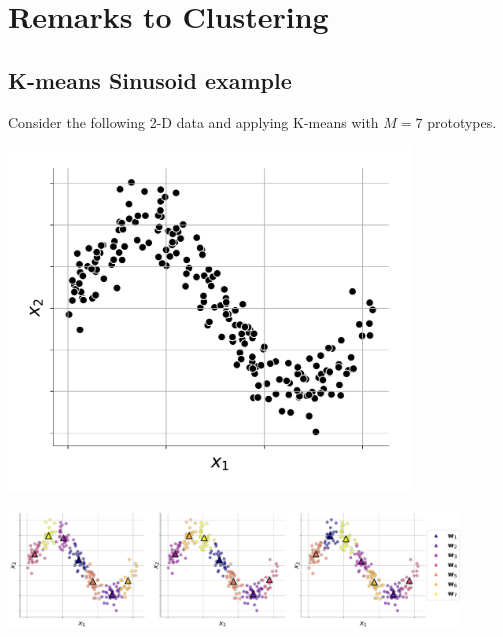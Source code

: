 \section{Remarks to Clustering}


\subsection{K-means Sinusoid example}

\begin{frame}{\subsecname}

Consider the following 2-D data and applying K-means with $M=7$ prototypes.

\begin{minipage}{0.45\textwidth}
\begin{center}
	\includegraphics[width=0.8\textwidth]{img/sin_data}
\end{center}
\end{minipage}
\begin{minipage}{0.45\textwidth}
\begin{center}
	\includegraphics[trim=950 0 0 0,clip, width=0.9\textwidth]{img/sin_clustering}
\end{center}
\end{minipage}

\end{frame}

